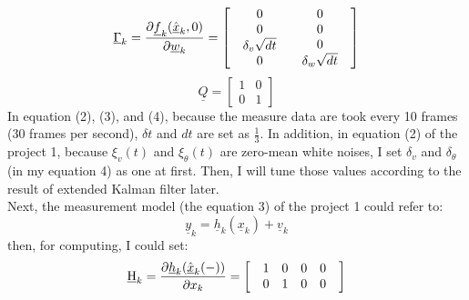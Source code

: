\documentclass{article}
\begin{document}
\begin{equation}
	\underline{\Gamma}_k  = \frac{{\partial \underline{f}_k (\hat{\underline{x}}_k ,0)}}{{\partial \underline{w}_k }} = \left[ {\begin{array}{*{20}c}
	   {\begin{array}{*{20}c}
	   0  \\
	   0  \\
	   {\delta _v \sqrt {dt} }  \\
	   0  \\
	\end{array}} & {\begin{array}{*{20}c}
	   0  \\
	   0  \\
	   0  \\
	   {\delta _w \sqrt {dt} }  \\
	\end{array}}  \\
	\end{array}} \right]
\end{equation}
\begin{equation}
\underline{Q}=\left[ \begin{array}{cc}
1 & 0 \\ 
0 & 1
\end{array}\right]  
\end{equation}
In equation (2), (3), and (4), because the measure data are took every 10 frames (30 frames per second), 
$\delta t$ and $dt$ are set as $\frac{1}{3}$. In addition, in equation (2) of the project 1, because $\xi_v (t)$ 
and $\xi_\theta (t)$ are zero-mean white noises, I set $\delta_v$ and $\delta_\theta$ (in my equation 4) as 
one at first. Then, I will tune those values according to the result of extended Kalman filter later.\\ 
Next, the measurement model (the equation 3) of the project 1 could refer to:
\begin{equation}
	\underline{y}_k = \underline{h}_k(\underline{x}_k) + \underline{v}_k
\end{equation}
then, for computing, I could set:
\begin{equation}
	\underline{{\rm H}}_k  = \frac{{\partial \underline{h}_k (\hat{\underline{x}}_k (-))}}{{\partial x_k }} = \left[ {\begin{array}{*{20}c}
	   {\begin{array}{*{20}c}
	   1 & 0 & 0 & 0  \\
	\end{array}}  \\
	   {\begin{array}{*{20}c}
	   0 & 1 & 0 & 0  \\
	\end{array}}  \\
	\end{array}} \right]
\end{equation}
\end{document}
